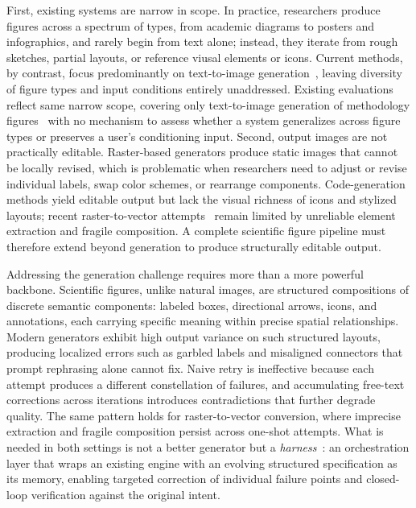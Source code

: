\documentclass{article}
\begin{document}
First, existing systems are narrow in scope. In practice, researchers produce figures across a spectrum of types, from academic diagrams to posters and infographics, and rarely begin from text alone; instead, they iterate from rough sketches, partial layouts, or reference viusal elements or icons. Current methods, by contrast, focus predominantly on text-to-image generation~\citep{zhu2026paperbanana,zhu2026autofigure,guo2026paper2sysarch,sun2025p2p}, leaving diversity of figure types and input conditions entirely unaddressed. Existing evaluations reflect same narrow scope, covering only text-to-image generation of methodology figures~\citep{zhu2026paperbanana} with no mechanism to assess whether a system generalizes across figure types or preserves a user's conditioning input.
Second, output images are not practically editable. Raster-based generators produce static images that cannot be locally revised, which is problematic when researchers need to adjust or revise individual labels, swap color schemes, or rearrange components. Code-generation methods yield editable output but lack the visual richness of icons and stylized layouts; recent raster-to-vector attempts~\citep{lin2026autofigureedit,editbanana2026} remain limited by unreliable element extraction and fragile composition. A complete scientific figure pipeline must therefore extend beyond generation to produce structurally editable output.

Addressing the generation challenge requires more than a more powerful backbone.
Scientific figures, unlike natural images, are structured
compositions of discrete semantic components: labeled boxes, directional arrows, icons, and annotations, each carrying specific meaning within precise spatial relationships.
Modern generators exhibit high output variance on such structured layouts, producing localized errors such as garbled labels and misaligned connectors that prompt rephrasing alone cannot fix. Naive retry is ineffective because each attempt produces a different constellation of failures, and accumulating free-text corrections across iterations introduces contradictions that further degrade quality. The same pattern holds for raster-to-vector conversion, where imprecise extraction and fragile composition persist across one-shot attempts. What is needed in both settings is not a better generator but a \emph{harness}~\citep{young2025harness,pan2026nlaharnesses,bui2026opendev, si2026contextskillslanguagemodels}: an orchestration layer that wraps an existing engine with an evolving structured specification as its memory, enabling targeted correction of individual failure points and closed-loop verification against the original intent.
\end{document}
